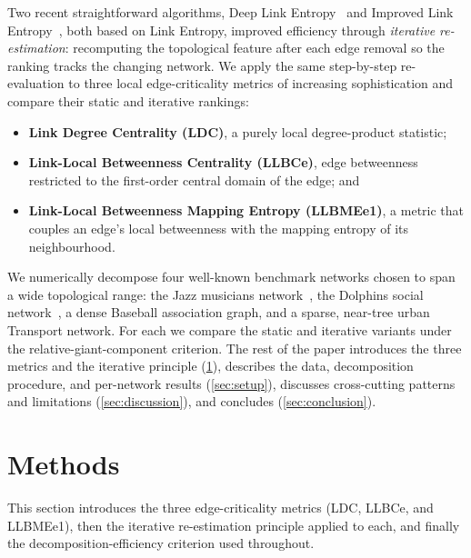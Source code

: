 \documentclass[runningheads,11pt]{article}
\begin{document}
Two recent straightforward algorithms, Deep Link
Entropy~\cite{ozaydin2021deep} and Improved Link
Entropy~\cite{lubashevskiy2023improved}, both based on Link Entropy, improved
efficiency through \emph{iterative re-estimation}: recomputing the topological
feature after each edge removal so the ranking tracks the changing network. We
apply the same step-by-step re-evaluation to three local edge-criticality
metrics of increasing sophistication and compare their static and iterative
rankings:
\begin{itemize}
\item \textbf{Link Degree Centrality (LDC)}, a purely local degree-product
statistic;
\item \textbf{Link-Local Betweenness Centrality (LLBCe)}, edge betweenness
restricted to the first-order central domain of the edge; and
\item \textbf{Link-Local Betweenness Mapping Entropy (LLBMEe1)}, a metric
that couples an edge's local betweenness with the mapping entropy of its
neighbourhood.
\end{itemize}
We numerically decompose four well-known benchmark networks chosen to span a
wide topological range: the Jazz musicians network~\cite{gleiser2003jazz}, the
Dolphins social network~\cite{lusseau2003dolphins}, a dense Baseball association
graph, and a sparse, near-tree urban Transport network. For each we compare the
static and iterative variants under the relative-giant-component criterion. The
rest of the paper introduces the three metrics and the iterative principle
(\cref{sec:methods}), describes the data, decomposition procedure, and
per-network results (\cref{sec:setup}), discusses cross-cutting patterns and
limitations (\cref{sec:discussion}), and concludes (\cref{sec:conclusion}).

\section{Methods}
\label{sec:methods}
This section introduces the three edge-criticality metrics (LDC, LLBCe, and
LLBMEe1), then the iterative re-estimation principle applied to each, and finally
the decomposition-efficiency criterion used throughout.
\end{document}
